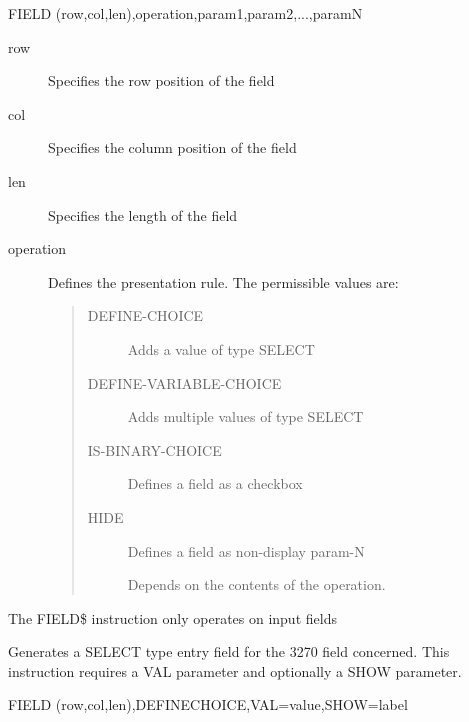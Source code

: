 \documentclass[letterpaper,10pt,english]{sphinxmanual}
\begin{document}
\begin{sphinxVerbatim}[commandchars=\\\{\}]
FIELD\PYGZdl{} (row,col,len),operation,param\PYGZhy{}1,param\PYGZhy{}2,...,param\PYGZhy{}N
\end{sphinxVerbatim}
\begin{description}
\item[{row}] \leavevmode
Specifies the row position of the field

\item[{col}] \leavevmode
Specifies the column position of the field

\item[{len}] \leavevmode
Specifies the length of the field

\item[{operation}] \leavevmode
Defines the presentation rule. The permissible values are:
\begin{quote}
\begin{description}
\item[{DEFINE-CHOICE}] \leavevmode
Adds a value of type SELECT

\item[{DEFINE-VARIABLE-CHOICE}] \leavevmode
Adds multiple values of type SELECT

\item[{IS-BINARY-CHOICE}] \leavevmode
Defines a field as a checkbox

\item[{HIDE}] \leavevmode
Defines a field as non-display param-N

Depends on the contents of the operation.

\end{description}
\end{quote}

\end{description}

The FIELD\$ instruction only operates on input fields


Generates a SELECT type entry field for the 3270 field concerned. This instruction requires a VAL parameter and
optionally a SHOW parameter.

\begin{sphinxVerbatim}[commandchars=\\\{\}]
FIELD\PYGZdl{} (row,col,len),DEFINE\PYGZhy{}CHOICE,VAL=\PYGZsq{}value\PYGZsq{},SHOW=\PYGZsq{}label\PYGZsq{}
\end{sphinxVerbatim}
\end{document}
